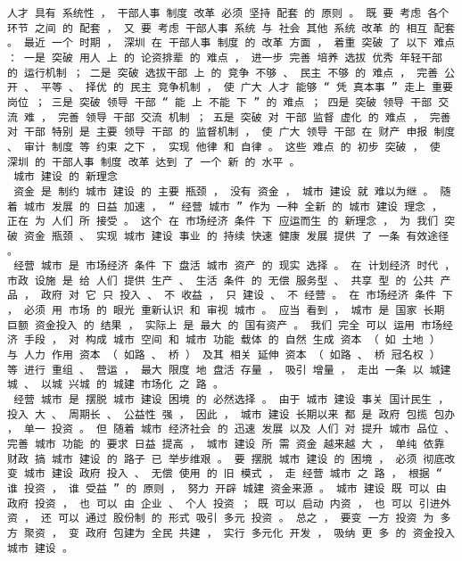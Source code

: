 \documentclass{article}
\begin{document}
\begin{Verbatim}[commandchars=\\\{\}]
 人才 具有 系统性 ， 干部人事 制度 改革 必须 坚持 配套 的 原则 。 既 要 考虑 各个环节 之间 的 配套 ， 又 要 考虑 干部人事 系统 与 社会 其他 系统 改革 的 相互 配套 。 最近 一个 时期 ， 深圳 在 干部人事 制度 的 改革 方面 ， 着重 突破 了 以下 难点 ： 一是 突破 用人 上 的 论资排辈 的 难点 ， 进一步 完善 培养 选拔 优秀 年轻干部 的 运行机制 ； 二是 突破 选拔干部 上 的 竞争 不够 、 民主 不够 的 难点 ， 完善 公开 、 平等 、 择优 的 民主 竞争机制 ， 使 广大 人才 能够 “ 凭 真本事 ” 走上 重要 岗位 ； 三是 突破 领导 干部 “ 能 上 不能 下 ” 的 难点 ； 四是 突破 领导 干部 交流 难 ， 完善 领导 干部 交流 机制 ； 五是 突破 对 干部 监督 虚化 的 难点 ， 完善 对 干部 特别 是 主要 领导 干部 的 监督机制 ， 使 广大 领导 干部 在 财产 申报 制度 、 审计 制度 等 约束 之下 ， 实现 他律 和 自律 。 这些 难点 的 初步 突破 ， 使 深圳 的 干部人事 制度 改革 达到 了 一个 新 的 水平 。 
 城市 建设 的 新理念 
 资金 是 制约 城市 建设 的 主要 瓶颈 ， 没有 资金 ， 城市 建设 就 难以为继 。 随着 城市 发展 的 日益 加速 ， “ 经营 城市 ” 作为 一种 全新 的 城市 建设 理念 ， 正在 为 人们 所 接受 。 这个 在 市场经济 条件 下 应运而生 的 新理念 ， 为 我们 突破 资金 瓶颈 、 实现 城市 建设 事业 的 持续 快速 健康 发展 提供 了 一条 有效途径 。 
 经营 城市 是 市场经济 条件 下 盘活 城市 资产 的 现实 选择 。 在 计划经济 时代 ， 市政 设施 是 给 人们 提供 生产 、 生活 条件 的 无偿 服务型 、 共享 型 的 公共 产品 ， 政府 对 它 只 投入 、 不 收益 ， 只 建设 、 不 经营 。 在 市场经济 条件 下 ， 必须 用 市场 的 眼光 重新认识 和 审视 城市 。 应当 看到 ， 城市 是 国家 长期 巨额 资金投入 的 结果 ， 实际上 是 最大 的 国有资产 。 我们 完全 可以 运用 市场经济 手段 ， 对 构成 城市 空间 和 城市 功能 载体 的 自然 生成 资本 （ 如 土地 ） 与 人力 作用 资本 （ 如路 、 桥 ） 及其 相关 延伸 资本 （ 如路 、 桥 冠名权 ） 等 进行 重组 、 营运 ， 最大 限度 地 盘活 存量 ， 吸引 增量 ， 走出 一条 以 城建 城 、 以城 兴城 的 城建 市场化 之 路 。 
 经营 城市 是 摆脱 城市 建设 困境 的 必然选择 。 由于 城市 建设 事关 国计民生 ， 投入 大 、 周期长 、 公益性 强 ， 因此 ， 城市 建设 长期以来 都 是 政府 包揽 包办 ， 单一 投资 。 但 随着 城市 经济社会 的 迅速 发展 以及 人们 对 提升 城市 品位 、 完善 城市 功能 的 要求 日益 提高 ， 城市 建设 所 需 资金 越来越 大 ， 单纯 依靠 财政 搞 城市 建设 的 路子 已 举步维艰 。 要 摆脱 城市 建设 的 困境 ， 必须 彻底改变 城市 建设 政府 投入 、 无偿 使用 的 旧 模式 ， 走 经营 城市 之 路 ， 根据 “ 谁 投资 ， 谁 受益 ” 的 原则 ， 努力 开辟 城建 资金来源 。 城市 建设 既 可以 由 政府 投资 ， 也 可以 由 企业 、 个人 投资 ； 既 可以 启动 内资 ， 也 可以 引进外资 ， 还 可以 通过 股份制 的 形式 吸引 多元 投资 。 总之 ， 要变 一方 投资 为 多方 聚资 ， 变 政府 包建为 全民 共建 ， 实行 多元化 开发 ， 吸纳 更 多 的 资金投入 城市 建设 。 

\end{Verbatim}
\end{document}

